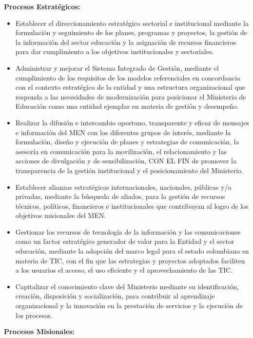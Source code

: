 \textbf{Procesos Estratégicos:}
\begin{itemize}
	\item Establecer el direccionamiento estratégico sectorial e institucional mediante la formulación y seguimiento de los planes, programas y proyectos, la gestión de la información del sector educación y la asignación de recursos financieros para dar cumplimiento a los objetivos institucionales y sectoriales.
	\item Administrar y mejorar el Sistema Integrado de Gestión, mediante el cumplimiento de los requisitos de los modelos referenciales en concordancia con el contexto estratégico de la entidad y una estructura organizacional que responda a las necesidades de modernización para posicionar el Ministerio de Educación como una entidad ejemplar en materia de gestión y desempeño.
	\item Realizar la difusión e intercambio oportuno, transparente y eficaz de mensajes e información del MEN con los diferentes grupos de interés, mediante la formulación, diseño y ejecución de planes y estrategias de comunicación, la asesoría en comunicación para la movilización, el relacionamiento y las acciones de divulgación y de sensibilización, CON EL FIN de promover la transparencia de la gestión institucional y el posicionamiento del Ministerio.
	\item Establecer alianzas estratégicas internacionales, nacionales, públicas y/o privadas, mediante la búsqueda de aliados, para la gestión de recursos técnicos, políticos, financieros e institucionales que contribuyan al logro de los objetivos misionales del MEN.
	\item Gestionar los recursos de tecnología de la información y las comunicaciones como un factor estratégico generador de valor para la Entidad y el sector educación, mediante la adopción del marco legal para el estado colombiano en materia de TIC, con el fin que las estrategias y proyectos adoptados faciliten a los usuarios el acceso, el uso eficiente y el aprovechamiento de las TIC.
	\item Capitalizar el conocimiento clave del Ministerio mediante su identificación, creación, disposición y socialización, para contribuir al aprendizaje organizacional y la innovación en la prestación de servicios y la ejecución de los procesos.
\end{itemize}

\textbf{Procesos Misionales:}

